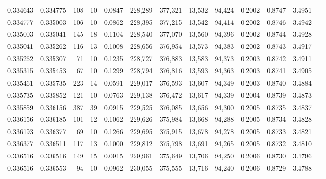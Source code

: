 \begin{tabular}{rrrrrrrrrrrrr}
0.334643 & 0.334775 &   108 &  10 &                                     0.0847 & 228,289 & 377,321 &  13,532 &  94,424 & 0.2002 & 0.8747 & 3.4951 \\
0.334777 & 0.335003 &   106 &  10 &                                     0.0862 & 228,395 & 377,215 &  13,542 &  94,414 & 0.2002 & 0.8746 & 3.4942 \\
0.335003 & 0.335041 &   145 &  18 &                                     0.1104 & 228,540 & 377,070 &  13,560 &  94,396 & 0.2002 & 0.8744 & 3.4928 \\
0.335041 & 0.335262 &   116 &  13 &                                     0.1008 & 228,656 & 376,954 &  13,573 &  94,383 & 0.2002 & 0.8743 & 3.4917 \\
0.335262 & 0.335307 &    71 &  10 &                                     0.1235 & 228,727 & 376,883 &  13,583 &  94,373 & 0.2003 & 0.8742 & 3.4911 \\
0.335315 & 0.335453 &    67 &  10 &                                     0.1299 & 228,794 & 376,816 &  13,593 &  94,363 & 0.2003 & 0.8741 & 3.4905 \\
0.335461 & 0.335735 &   223 &  14 &                                     0.0591 & 229,017 & 376,593 &  13,607 &  94,349 & 0.2003 & 0.8740 & 3.4884 \\
0.335735 & 0.335852 &   121 &  10 &                                     0.0763 & 229,138 & 376,472 &  13,617 &  94,339 & 0.2004 & 0.8739 & 3.4873 \\
0.335859 & 0.336156 &   387 &  39 &                                     0.0915 & 229,525 & 376,085 &  13,656 &  94,300 & 0.2005 & 0.8735 & 3.4837 \\
0.336156 & 0.336185 &   101 &  12 &                                     0.1062 & 229,626 & 375,984 &  13,668 &  94,288 & 0.2005 & 0.8734 & 3.4828 \\
0.336193 & 0.336377 &    69 &  10 &                                     0.1266 & 229,695 & 375,915 &  13,678 &  94,278 & 0.2005 & 0.8733 & 3.4821 \\
0.336377 & 0.336511 &   117 &  13 &                                     0.1000 & 229,812 & 375,798 &  13,691 &  94,265 & 0.2005 & 0.8732 & 3.4810 \\
0.336516 & 0.336516 &   149 &  15 &                                     0.0915 & 229,961 & 375,649 &  13,706 &  94,250 & 0.2006 & 0.8730 & 3.4796 \\
0.336516 & 0.336553 &    94 &  10 &                                     0.0962 & 230,055 & 375,555 &  13,716 &  94,240 & 0.2006 & 0.8729 & 3.4788 \\

\end{tabular}
